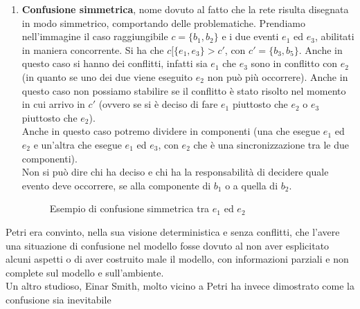 \begin{definizione}
\begin{enumerate}
    \item \textbf{Confusione simmetrica}, nome dovuto al fatto che la rete
    risulta disegnata in modo simmetrico, comportando delle
    problematiche. Prendiamo nell'immagine il caso raggiungibile $c=\{b_1, b_2\}$
    e i due eventi $e_1$ ed $e_3$, abilitati in maniera concorrente. Si ha che
    $c[\{e_1, e_3\}>c'$, con $c'=\{b_3, b_5\}$. Anche in questo caso si hanno dei
    conflitti, infatti sia $e_1$ che $e_3$ sono in conflitto con $e_2$ (in
    quanto se uno dei due viene eseguito $e_2$ non può più occorrere). Anche in
    questo caso non possiamo stabilire se il conflitto è stato risolto nel momento
    in cui arrivo in $c'$ (ovvero se si è deciso di fare $e_1$ piuttosto che
    $e_2$ o $e_3$ piuttosto che $e_2$).\\
    Anche in questo caso potremo dividere in componenti (una che esegue $e_1$ ed
    $e_2$ e un'altra che esegue $e_1$ ed $e_3$, con $e_2$ che è una
    sincronizzazione tra le due componenti).\\
    Non si può dire chi ha deciso e chi ha la responsabilità di decidere quale
    evento deve occorrere, se alla componente di $b_1$ o a quella di $b_2$.\\
    \begin{figure}[H]
      \centering
      \caption{Esempio di confusione simmetrica tra $e_1$ ed $e_2$} 
    \end{figure}
  \end{enumerate}
  Petri era convinto, nella sua visione deterministica e senza conflitti, che
  l'avere una situazione di confusione nel modello fosse dovuto al non aver
  esplicitato alcuni aspetti o di aver costruito male il modello, con
  informazioni parziali e non complete sul modello e sull'ambiente.\\
  Un altro studioso, Einar Smith, molto vicino a Petri ha invece dimostrato come
  la confusione sia inevitabile
\end{definizione} \vspace{5mm} %
